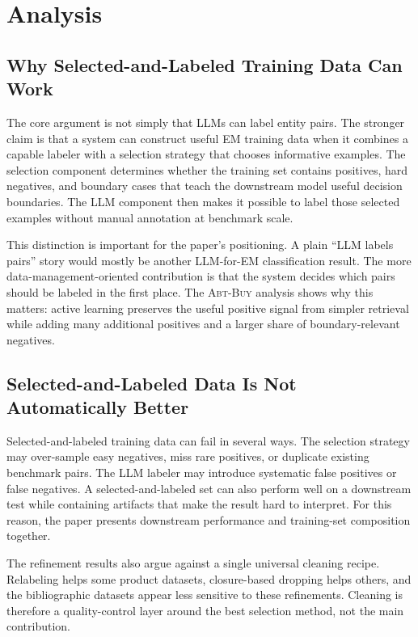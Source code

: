 \section{Analysis}

\subsection{Why Selected-and-Labeled Training Data Can Work}

The core argument is not simply that LLMs can label entity pairs. The stronger claim is that a system can construct useful EM training data when it combines a capable labeler with a selection strategy that chooses informative examples. The selection component determines whether the training set contains positives, hard negatives, and boundary cases that teach the downstream model useful decision boundaries. The LLM component then makes it possible to label those selected examples without manual annotation at benchmark scale.

This distinction is important for the paper's positioning. A plain ``LLM labels pairs'' story would mostly be another LLM-for-EM classification result. The more data-management-oriented contribution is that the system decides which pairs should be labeled in the first place. The \textsc{Abt-Buy} analysis shows why this matters: active learning preserves the useful positive signal from simpler retrieval while adding many additional positives and a larger share of boundary-relevant negatives.

\subsection{Selected-and-Labeled Data Is Not Automatically Better}

Selected-and-labeled training data can fail in several ways. The selection strategy may over-sample easy negatives, miss rare positives, or duplicate existing benchmark pairs. The LLM labeler may introduce systematic false positives or false negatives. A selected-and-labeled set can also perform well on a downstream test while containing artifacts that make the result hard to interpret. For this reason, the paper presents downstream performance and training-set composition together.

The refinement results also argue against a single universal cleaning recipe. Relabeling helps some product datasets, closure-based dropping helps others, and the bibliographic datasets appear less sensitive to these refinements. Cleaning is therefore a quality-control layer around the best selection method, not the main contribution.

